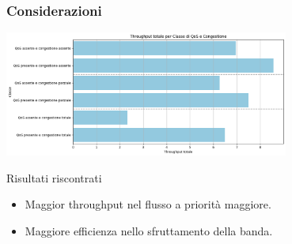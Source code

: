 \documentclass[aspectratio=169]{beamer}
\begin{document}
\begin{frame}
    \frametitle{Considerazioni}
    \centering
    \includegraphics[width=0.7\textwidth]{throughput_bar.png}
    \begin{block}{Risultati riscontrati}
        \begin{itemize}
            \item Maggior throughput nel flusso a priorità maggiore.
            \item Maggiore efficienza nello sfruttamento della banda.
        \end{itemize}
    \end{block}
\end{frame}

\end{document}
